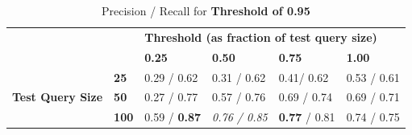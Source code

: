 \documentclass[12pt]{IEEEtran}
\begin{document}
\begin{table}[]
\centering
\caption{Precision / Recall for \textbf{Threshold of 0.95}}
\label{t95}
\begin{tabular}{ll|llll}
\cline{3-6}
                                                       &              & \multicolumn{4}{l|}{\textbf{Threshold (as fraction of test query size)}}                                                                          \\ \cline{3-6} 
\textbf{}                                              &              & \multicolumn{1}{l|}{\textbf{0.25}} & \multicolumn{1}{l|}{\textbf{0.50}} & \multicolumn{1}{l|}{\textbf{0.75}} & \multicolumn{1}{l|}{\textbf{1.00}} \\ \hline
\multicolumn{1}{|l|}{\multirow{3}{*}{\textbf{Test Query Size}}} & \textbf{25}  & 0.29 / 0.62                        & 0.31 / 0.62                         & 0.41/ 0.62                       & 0.53 / 0.61                       \\ \cline{2-2}
\multicolumn{1}{|l|}{}                                 & \textbf{50}  & 0.27 / 0.77                        & 0.57 / 0.76                         & 0.69 / 0.74                         & 0.69 / 0.71                        \\ \cline{2-2}
\multicolumn{1}{|l|}{}                                 & \textbf{100} & 0.59 / \textbf{0.87}                          & \emph{0.76 / 0.85}                    & \textbf{0.77} / 0.81                         & 0.74 / 0.75                         \\ \cline{1-2}
\end{tabular}
\end{table}
\end{document}
